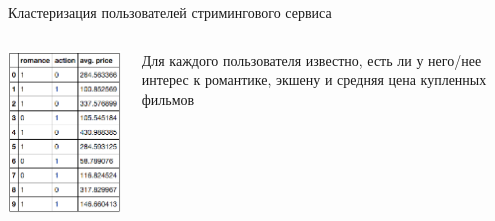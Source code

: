 \documentclass[aspectratio=169]{beamer}
\begin{document}
\begin{frame}{Кластеризация пользователей стримингового сервиса}

\begin{columns}[T]
    \begin{column}{.5\textwidth}
    \begin{center}
   		\includegraphics[scale=0.5]{images/movies_data.png}
    \end{center}   
    \end{column}
       
    \begin{column}{.5\textwidth}
	Для каждого пользователя известно, есть ли у него/нее интерес к романтике, экшену и средняя цена купленных фильмов
    \end{column}
  \end{columns}

\end{frame}
\end{document}
